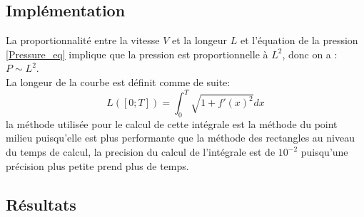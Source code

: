 \documentclass{article}
\begin{document}
\newpage
\subsection{Implémentation}
La proportionnalité entre la vitesse $V$ et la longeur $L$ et l'équation de la pression \ref{Pressure_eq} implique que la pression est proportionnelle à $L^2$, donc on a : $P \sim L^2$.\\
La longeur de la courbe est définit comme de suite: 
\begin{equation}
    L([0;T]) = \int_0^{T}\sqrt{1+f'(x)^2}dx
\end{equation}
la méthode utilisée pour le calcul de cette intégrale est la méthode du point milieu puisqu'elle est plus performante que la méthode des rectangles au niveau du temps de calcul, la precision du calcul de l'intégrale est de $10^{-2}$ puisqu'une précision plus petite prend plus de temps.

\subsection{Résultats}
\end{document}

